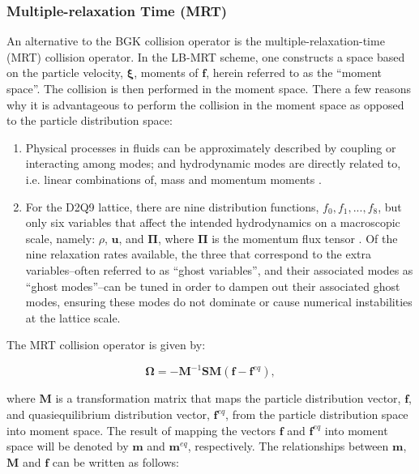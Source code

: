 \documentclass[pdftex,ms]{pittetd}
\newcommand{\pvel}{\boldsymbol{\xi}}
\newcommand{\colop}{\boldsymbol{\Omega}}
\newcommand{\transM}{\mathbf{M}}
\newcommand{\relaxM}{\mathbf{S}}
\begin{document}
\subsubsection{Multiple-relaxation Time (MRT)}

An alternative to the BGK collision operator is the multiple-relaxation-time (MRT) collision operator.
In the LB-MRT scheme, one constructs a space based on the particle velocity, $\pvel$, moments of $\mathbf{f}$, herein referred to as the ``moment space''.
The collision is then performed in the moment space.
There a few reasons why it is advantageous to perform the collision in the moment space as opposed to the particle distribution space:
\begin{enumerate}
    \item Physical processes in fluids can be approximately described by coupling or interacting among modes; and hydrodynamic modes are directly related to, i.e. linear combinations of, mass and momentum moments \cite{lallemand2000theory}.
    \item For the D2Q9 lattice, there are nine distribution functions, $f_0, f_1, ..., f_8$, but only six variables that affect the intended hydrodynamics on a macroscopic scale, namely: $\rho$, $\mathbf{u}$, and $\mathbf{\Pi}$, where $\mathbf{\Pi}$ is the momentum flux tensor \cite{dellar2003incompressible}.
    Of the nine relaxation rates available, the three that correspond to the extra variables--often referred to as ``ghost variables'', and their associated modes as ``ghost modes''--can be tuned in order to dampen out their associated ghost modes, ensuring these modes do not dominate or cause numerical instabilities at the lattice scale.
\end{enumerate}

The MRT collision operator is given by:

\begin{equation} \label{eq:mrt-colop}
	\colop = - {\transM}^{-1} \relaxM \transM (\mathbf{f} - \mathbf{f}^{eq}),
\end{equation}

\noindent where $\transM$ is a transformation matrix that maps the particle distribution vector, $\mathbf{f}$, and quasiequilibrium distribution vector, $\mathbf{f}^{eq}$, from the particle distribution space into moment space.
The result of mapping the vectors $\mathbf{f}$ and $\mathbf{f}^{eq}$ into moment space will be denoted by $\mathbf{m}$ and $\mathbf{m}^{eq}$, respectively.
The relationships between $\mathbf{m}$, $\transM$ and $\mathbf{f}$ can be written as follows:
\end{document}
